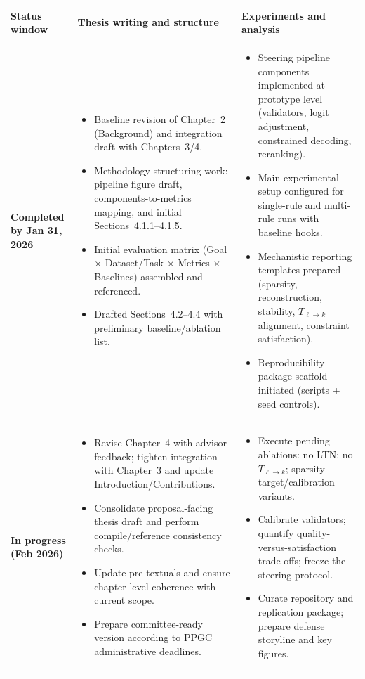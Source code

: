 ﻿\documentclass[../../ppgc-prop-tese.tex]{subfiles}
\begin{document}

\small\begin{longtable}{p{}p{}p{}}
\centering
\textbf{Status window} & \textbf{Thesis writing and structure} & \textbf{Experiments and analysis} \\
\hline
\textbf{Completed by Jan 31, 2026} &
\begin{itemize}
  \item Baseline revision of Chapter~2 (Background) and integration draft with Chapters~3/4.
  \item Methodology structuring work: pipeline figure draft, components-to-metrics mapping, and initial Sections~4.1.1--4.1.5.
  \item Initial evaluation matrix (Goal $\times$ Dataset/Task $\times$ Metrics $\times$ Baselines) assembled and referenced.
  \item Drafted Sections~4.2--4.4 with preliminary baseline/ablation list.
\end{itemize}
&
\begin{itemize}
  \item Steering pipeline components implemented at prototype level (validators, logit adjustment, constrained decoding, reranking).
  \item Main experimental setup configured for single-rule and multi-rule runs with baseline hooks.
  \item Mechanistic reporting templates prepared (sparsity, reconstruction, stability, $T_{\ell\to k}$ alignment, constraint satisfaction).
  \item Reproducibility package scaffold initiated (scripts + seed controls).
\end{itemize}
\\

\textbf{In progress (Feb 2026)} &
\begin{itemize}
  \item Revise Chapter~4 with advisor feedback; tighten integration with Chapter~3 and update Introduction/Contributions.
  \item Consolidate proposal-facing thesis draft and perform compile/reference consistency checks.
  \item Update pre-textuals and ensure chapter-level coherence with current scope.
  \item Prepare committee-ready version according to PPGC administrative deadlines.
\end{itemize}
&
\begin{itemize}
  \item Execute pending ablations: no LTN; no $T_{\ell\to k}$; sparsity target/calibration variants.
  \item Calibrate validators; quantify quality-versus-satisfaction trade-offs; freeze the steering protocol.
  \item Curate repository and replication package; prepare defense storyline and key figures.
\end{itemize}
\\


\end{longtable}
\end{document}
